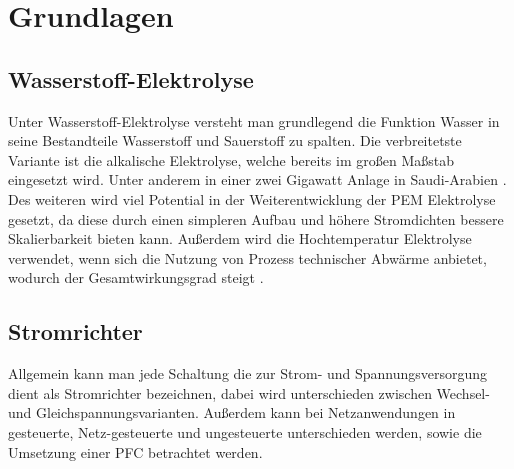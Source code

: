 \chapter{Grundlagen}


\section{Wasserstoff-Elektrolyse}
Unter Wasserstoff-Elektrolyse versteht man grundlegend die Funktion Wasser in seine Bestandteile Wasserstoff und Sauerstoff zu spalten. Die verbreitetste Variante ist die alkalische Elektrolyse, welche bereits im großen Maßstab eingesetzt wird. Unter anderem in einer zwei Gigawatt Anlage in Saudi-Arabien \cite{2GWely} . Des weiteren wird viel Potential in der Weiterentwicklung der PEM Elektrolyse gesetzt, da diese durch einen simpleren Aufbau und höhere Stromdichten bessere Skalierbarkeit bieten kann. Außerdem wird die Hochtemperatur Elektrolyse verwendet, wenn sich die Nutzung von Prozess technischer Abwärme anbietet, wodurch der Gesamtwirkungsgrad steigt \cite{Elektrolyse}.  

\section{Stromrichter}
Allgemein kann man jede Schaltung die zur Strom- und Spannungsversorgung dient als Stromrichter bezeichnen, dabei wird unterschieden zwischen Wechsel- und Gleichspannungsvarianten. Außerdem kann bei Netzanwendungen in gesteuerte, Netz-gesteuerte und ungesteuerte unterschieden werden, sowie die Umsetzung einer \gls{PFC} betrachtet werden. 
